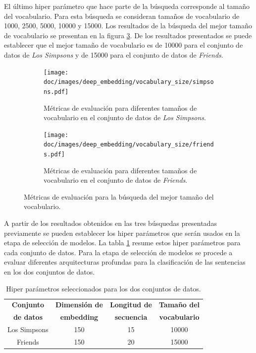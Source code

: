 El último hiper parámetro que hace parte de la búsqueda corresponde al tamaño del vocabulario. Para esta búsqueda se consideran tamaños de vocabulario de 1000, 2500, 5000, 10000 y 15000. Los resultados de la búsqueda del mejor tamaño de vocabulario se presentan en la figura \ref{fig:em_vocabulary_size}. De los resultados presentados se puede establecer que el mejor tamaño de vocabulario es de 10000 para el conjunto de datos de \textit{Los Simpsons} y de 15000 para el conjunto de datos de \textit{Friends}.

\begin{figure}[H]
    \centering
    \begin{subfigure}[b]{0.45\textwidth}
        \centering
        \texttt{[image: doc/images/deep\_embedding/vocabulary\_size/simpsons.pdf]}
        \caption{Métricas de evaluación para diferentes tamaños de vocabulario en el conjunto de datos de \textit{Los Simpsons}.}
        \label{fig:em_vocabulary_size_simpsons}
    \end{subfigure}
    \hfill
    \begin{subfigure}[b]{0.45\textwidth}
        \centering
        \texttt{[image: doc/images/deep\_embedding/vocabulary\_size/friends.pdf]}
        \caption{Métricas de evaluación para diferentes tamaños de vocabulario en el conjunto de datos de \textit{Friends}.}
        \label{fig:em_vocabulary_size_friends}
    \end{subfigure}
    \caption{Métricas de evaluación para la búsqueda del mejor tamaño del vocabulario.}
    \label{fig:em_vocabulary_size}
\end{figure}

A partir de los resultados obtenidos en las tres búsquedas presentadas previamente se pueden establecer los hiper parámetros que serán usados en la etapa de selección de modelos. La tabla \ref{tab:em_hyper_params} resume estos hiper parámetros para cada conjunto de datos. Para la etapa de selección de modelos se procede a evaluar diferentes arquitecturas profundas para la clasificación de las sentencias en los dos conjuntos de datos.

\begin{table}[H]
    \centering
    \begin{tabular}{|c|c|c|c|}
        \hline
        \textbf{Conjunto } & \textbf{Dimensión de} & \textbf{Longitud de} & \textbf{Tamaño del}  \\
        \textbf{de datos} & \textbf{embedding} & \textbf{secuencia} & \textbf{vocabulario} \\ \hline
        Los Simpsons & 150 & 15 & 10000 \\ \hline
        Friends & 150 & 20 & 15000 \\ \hline
    \end{tabular}
    \caption{Hiper parámetros seleccionados para los dos conjuntos de datos.}
    \label{tab:em_hyper_params}
\end{table}

